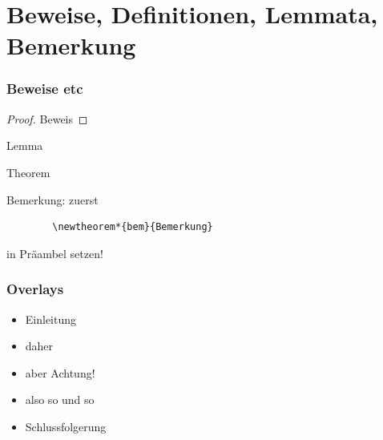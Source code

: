 \section{Beweise, Definitionen, Lemmata, Bemerkung}
\begin{frame}[fragile]
	\frametitle{Beweise etc}

    \begin{proof}
        Beweis
    \end{proof}
    
    \begin{lemma}
        Lemma
    \end{lemma}
    
    \begin{theorem}
        Theorem
    \end{theorem}
    
     \begin{bem}
	Bemerkung: zuerst 
	  \begin{verbatim}
	    \newtheorem*{bem}{Bemerkung}
	  \end{verbatim}
	  in Präambel setzen! 
     \end{bem}
\end{frame}










\begin{frame}
	\frametitle{Overlays}
   \begin{itemize}
        \item Einleitung
        \item<2-> daher
        \item<alert@3> aber Achtung!
        \item<3-> also so und so
        \item<4-> Schlussfolgerung
   \end{itemize}
\end{frame}









